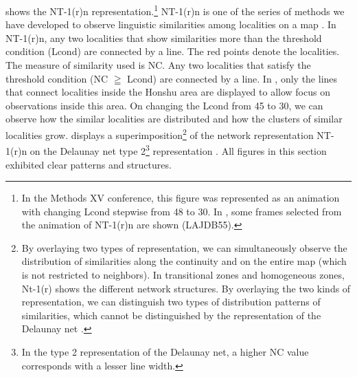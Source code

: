 \documentclass[output=paper]{LSP/langsci}
\begin{document}
 shows the NT-1(r)n representation.\footnote{ In the Methods XV conference, this figure was represented as an animation with changing Lcond stepwise from 48 to 30. In , some frames selected from the animation of NT-1(r)n are shown (LAJDB55).} NT-1(r)n is one of the series of methods we have developed to observe linguistic similarities among localities on a map \citep[2]{kumagai_development_2013}. In NT-1(r)n, any two localities that show similarities more than the threshold condition (Lcond) are connected by a line. The red points denote the localities. The measure of similarity used is NC. Any two localities that satisfy the threshold condition (NC \textsf{${\geqq}$ }Lcond) are connected by a line. In , only the lines that connect localities inside the Honshu area are displayed to allow focus on observations inside this area. On changing the Lcond from 45 to 30, we can observe how the similar localities are distributed and how the clusters of similar localities grow.  displays a superimposition\footnote{By overlaying two types of representation, we can simultaneously observe the distribution of similarities along the continuity and on the entire map (which is not restricted to neighbors). In transitional zones and homogeneous zones, Nt-1(r) shows the different network structures. By overlaying the two kinds of representation, we can distinguish two types of distribution patterns of similarities, which cannot be distinguished by the representation of the Delaunay net \citep[7]{kumagai_development_2013}.} of the network representation NT-1(r)n on the Delaunay net type 2\footnote{ In the type 2 representation of the Delaunay net, a higher NC value corresponds with a lesser line width.} representation \citep[6--7]{kumagai_development_2013}. All figures in this section exhibited clear patterns and structures. 
\end{document}
